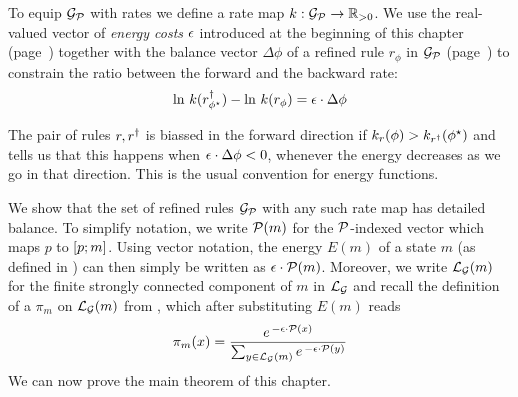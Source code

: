 To equip $\mathcal{G}_{\mathcal{P}}$ with rates
we define a rate map $k: \mathcal{G}_{\mathcal{P}} \to \mathbb{R}_{>0}$.
We use the real-valued vector of \emph{energy costs} $\epsilon$
introduced at the beginning of this chapter
(page~\pageref{chp:direct})
together with the balance vector $\Delta\phi$
of a refined rule $r_\phi$ in $\mathcal{G}_{\mathcal{P}}$
(page~\pageref{p:balance-vector})
to constrain the ratio
between the forward and the backward rate:
\begin{equation}
  \label{eq:rates}
  \ln\, {k(r^\dagger_{\phi^\star})} - \ln\, {k(r_\phi)} =
  \epsilon \cdot \Delta\phi
\end{equation}

The pair of rules $r,r^\dagger$ is biassed in the forward direction
if $k_r(\phi) > k_{r^\dagger}(\phi^\star)$
and  tells us that this happens
when $\epsilon \cdot \Delta\phi < 0$,
\ie whenever the energy decreases as we go in that direction.
This is the usual convention for energy functions.

We show that the set of refined rules $\mathcal{G}_{\mathcal{P}}$
with any such rate map
has detailed balance.
To simplify notation,
we write $\mathcal{P}(m)$
for the $\mathcal{P}$-indexed vector
which maps $p$ to $\left[p;m\right]$.
Using vector notation,
the energy $E(m)$ of a state $m$
(as defined in )
can then simply be written as $\epsilon \cdot \mathcal{P}(m)$.
Moreover, we write $\mathcal{L}_{\mathcal{G}}(m)$ for the finite
strongly connected component of $m$ in $\mathcal{L}_{\mathcal{G}}$
and recall the definition of a \pmf
$\pi_m$ on $\mathcal{L}_{\mathcal{G}}(m)$ from ,
which after substituting $E(m)$ reads
\begin{equation}
  \label{eq:boltzmann}
  \pi_m(x) = \dfrac{
    e^{\,-\epsilon \cdot \mathcal{P}(x)}}{
    \sum_{y \in \mathcal{L}_{\mathcal{G}}(m)} e^{\,-\epsilon \cdot \mathcal{P}(y)}}
\end{equation}
%
We can now prove the main theorem of this chapter.


